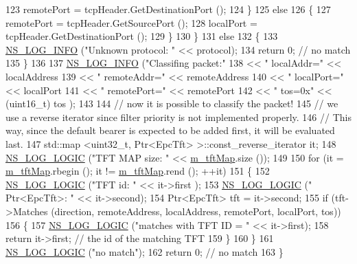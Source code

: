 \begin{DoxyCode}
123           remotePort = tcpHeader.GetDestinationPort ();
124         \}
125       \textcolor{keywordflow}{else}
126         \{
127           remotePort = tcpHeader.GetSourcePort ();
128           localPort = tcpHeader.GetDestinationPort ();
129         \}
130     \}
131   \textcolor{keywordflow}{else}
132     \{
133       \hyperlink{group__logging_gafbd73ee2cf9f26b319f49086d8e860fb}{NS\_LOG\_INFO} (\textcolor{stringliteral}{"Unknown protocol: "} << protocol);
134       \textcolor{keywordflow}{return} 0;  \textcolor{comment}{// no match}
135     \}
136 
137   \hyperlink{group__logging_gafbd73ee2cf9f26b319f49086d8e860fb}{NS\_LOG\_INFO} (\textcolor{stringliteral}{"Classifing packet:"}
138                << \textcolor{stringliteral}{" localAddr="}  << localAddress 
139                << \textcolor{stringliteral}{" remoteAddr="} << remoteAddress 
140                << \textcolor{stringliteral}{" localPort="}  << localPort 
141                << \textcolor{stringliteral}{" remotePort="} << remotePort 
142                << \textcolor{stringliteral}{" tos=0x"} << (uint16\_t) tos );
143 
144   \textcolor{comment}{// now it is possible to classify the packet!}
145   \textcolor{comment}{// we use a reverse iterator since filter priority is not implemented properly.}
146   \textcolor{comment}{// This way, since the default bearer is expected to be added first, it will be evaluated last.}
147   std::map <uint32\_t, Ptr<EpcTft> >::const\_reverse\_iterator it;
148   \hyperlink{group__logging_ga88acd260151caf2db9c0fc84997f45ce}{NS\_LOG\_LOGIC} (\textcolor{stringliteral}{"TFT MAP size: "} << \hyperlink{classns3_1_1EpcTftClassifier_aa81c06fa8f3716646081c11e821b50e2}{m\_tftMap}.size ());
149 
150   \textcolor{keywordflow}{for} (it = \hyperlink{classns3_1_1EpcTftClassifier_aa81c06fa8f3716646081c11e821b50e2}{m\_tftMap}.rbegin (); it != \hyperlink{classns3_1_1EpcTftClassifier_aa81c06fa8f3716646081c11e821b50e2}{m\_tftMap}.rend (); ++it)
151     \{
152       \hyperlink{group__logging_ga88acd260151caf2db9c0fc84997f45ce}{NS\_LOG\_LOGIC} (\textcolor{stringliteral}{"TFT id: "} << it->first );
153       \hyperlink{group__logging_ga88acd260151caf2db9c0fc84997f45ce}{NS\_LOG\_LOGIC} (\textcolor{stringliteral}{" Ptr<EpcTft>: "} << it->second);
154       Ptr<EpcTft> tft = it->second;         
155       \textcolor{keywordflow}{if} (tft->Matches (direction, remoteAddress, localAddress, remotePort, localPort, tos))
156         \{
157           \hyperlink{group__logging_ga88acd260151caf2db9c0fc84997f45ce}{NS\_LOG\_LOGIC} (\textcolor{stringliteral}{"matches with TFT ID = "} << it->first);
158           \textcolor{keywordflow}{return} it->first; \textcolor{comment}{// the id of the matching TFT}
159         \}
160     \}
161   \hyperlink{group__logging_ga88acd260151caf2db9c0fc84997f45ce}{NS\_LOG\_LOGIC} (\textcolor{stringliteral}{"no match"});
162   \textcolor{keywordflow}{return} 0;  \textcolor{comment}{// no match}
163 \}
\end{DoxyCode}



